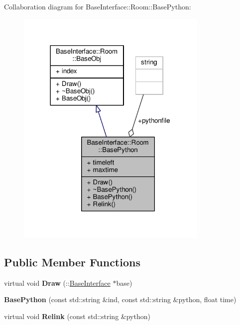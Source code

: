 Collaboration diagram for Base\+Interface\+:\+:Room\+:\+:Base\+Python\+:
\nopagebreak
\begin{figure}[H]
\begin{center}
\leavevmode
\includegraphics[width=261pt]{dd/d15/classBaseInterface_1_1Room_1_1BasePython__coll__graph}
\end{center}
\end{figure}
\subsection*{Public Member Functions}
\begin{DoxyCompactItemize}
\item 
virtual void {\bfseries Draw} (\+::\hyperlink{classBaseInterface}{Base\+Interface} $\ast$base)\hypertarget{classBaseInterface_1_1Room_1_1BasePython_a22476519ba284df80931c7453acc62c2}{}\label{classBaseInterface_1_1Room_1_1BasePython_a22476519ba284df80931c7453acc62c2}

\item 
{\bfseries Base\+Python} (const std\+::string \&ind, const std\+::string \&python, float time)\hypertarget{classBaseInterface_1_1Room_1_1BasePython_a424ff002e5aee159a48603937b0c01ab}{}\label{classBaseInterface_1_1Room_1_1BasePython_a424ff002e5aee159a48603937b0c01ab}

\item 
virtual void {\bfseries Relink} (const std\+::string \&python)\hypertarget{classBaseInterface_1_1Room_1_1BasePython_a0b9521ae0409d63876c282bef515aee4}{}\label{classBaseInterface_1_1Room_1_1BasePython_a0b9521ae0409d63876c282bef515aee4}

\end{DoxyCompactItemize}
